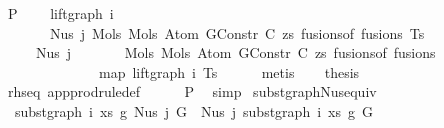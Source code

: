 \begin{isabellebody}
\ P{}{\isacharcolon}{\kern0pt}\isanewline
\ \ \ \ {\isachardoublequoteopen}lift{\isacharunderscore}{\kern0pt}graph\ i\isanewline
\ \ \ \ \ \ \ {\isacharparenleft}{\kern0pt}Nus{}\ j\ {\isacharparenleft}{\kern0pt}Mols{}\ {\isacharparenleft}{\kern0pt}Mols{}\ {\isacharparenleft}{\kern0pt}Atom\ {\isacharparenleft}{\kern0pt}GConstr\ C{\isacharparenright}{\kern0pt}\ zs{\isacharparenright}{\kern0pt}\ {\isacharparenleft}{\kern0pt}fusions{\isacharunderscore}{\kern0pt}of\ fusions{\isacharparenright}{\kern0pt}{\isacharparenright}{\kern0pt}\ Ts{\isacharparenright}{\kern0pt}{\isacharparenright}{\kern0pt}\ {\isacharequal}{\kern0pt}\isanewline
\ \ \ \ \ Nus{}\ j\isanewline
\ \ \ \ \ \ \ {\isacharparenleft}{\kern0pt}Mols{}\ {\isacharparenleft}{\kern0pt}Mols{}\ {\isacharparenleft}{\kern0pt}Atom\ {\isacharparenleft}{\kern0pt}GConstr\ C{\isacharparenright}{\kern0pt}\ zs{\isacharparenright}{\kern0pt}\ {\isacharparenleft}{\kern0pt}fusions{\isacharunderscore}{\kern0pt}of\ fusions{\isacharparenright}{\kern0pt}{\isacharparenright}{\kern0pt}\isanewline
\ \ \ \ \ \ \ \ \ \ \ \ \ \ {\isacharparenleft}{\kern0pt}map\ {\isacharparenleft}{\kern0pt}lift{\isacharunderscore}{\kern0pt}graph\ i{\isacharparenright}{\kern0pt}\ Ts{\isacharparenright}{\kern0pt}{\isacharparenright}{\kern0pt}{\isachardoublequoteclose}\isanewline
\ \ \ \ \isamarkupfalse%
\ metis\isanewline
\isanewline
\ \ \isamarkupfalse%
\ {\isacharquery}{\kern0pt}thesis\isanewline
\ \ \ \ \isamarkupfalse%
\ rhs{\isacharunderscore}{\kern0pt}eq\ app{\isacharunderscore}{\kern0pt}prodrule{\isacharunderscore}{\kern0pt}def\isanewline
\ \ \ \ \isamarkupfalse%
\ P{}\ \isamarkupfalse%
\ simp\isanewline
{}\isamarkupfalse%
%
\endisatagproof
{\isafoldproof}%
%
\isadelimproof
%
\endisadelimproof
%
\isadelimdocument
%
\endisadelimdocument
%
\isatagdocument
%
\isamarkuptrue%
%
\endisatagdocument
{\isafolddocument}%
%
\isadelimdocument
%
\endisadelimdocument
{}\isamarkupfalse%
\ subst{\isacharunderscore}{\kern0pt}graph{\isacharunderscore}{\kern0pt}Nus{}{\isacharunderscore}{\kern0pt}equiv{\isacharcolon}{\kern0pt}\isanewline
\ \ {\isachardoublequoteopen}subst{\isacharunderscore}{\kern0pt}graph\ i\ xs\ g{}\ {\isacharparenleft}{\kern0pt}Nus{}\ j\ G{\isacharparenright}{\kern0pt}\ {\isacharequal}{\kern0pt}\ Nus{}\ j\ {\isacharparenleft}{\kern0pt}subst{\isacharunderscore}{\kern0pt}graph\ i\ xs\ g{}\ G{\isacharparenright}{\kern0pt}{\isachardoublequoteclose}\isanewline

\end{isabellebody}
